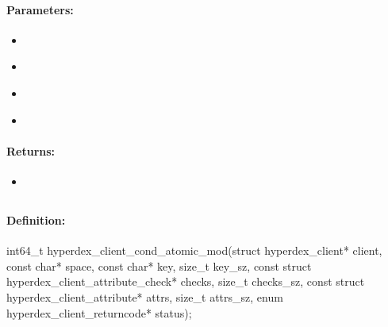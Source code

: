 \paragraph{Parameters:}
\begin{itemize}[noitemsep]
\item {}\\

\item {}\\

\item {}\\

\item {}\\

\end{itemize}

\paragraph{Returns:}
\begin{itemize}[noitemsep]
\item {}\\

\end{itemize}

\pagebreak
\subsection{}
\label{api:c:cond_atomic_mod}


\paragraph{Definition:}
\begin{ccode}
int64_t hyperdex_client_cond_atomic_mod(struct hyperdex_client* client,
        const char* space,
        const char* key, size_t key_sz,
        const struct hyperdex_client_attribute_check* checks, size_t checks_sz,
        const struct hyperdex_client_attribute* attrs, size_t attrs_sz,
        enum hyperdex_client_returncode* status);
\end{ccode}


